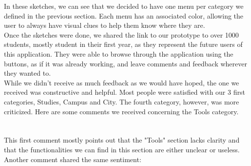\documentclass{eplmastersthesis}
\begin{document}
In these sketches, we can see that we decided to have one menu per category we defined in the previous section. Each menu has an associated color, allowing the user to always have visual clues to help them know where they are.\\

Once the sketches were done, we shared the link to our prototype to over 1000 students, mostly student in their first year, as they represent the future users of this application. They were able to browse through the application using the buttons, as if it was already working, and leave comments and feedback wherever they wanted to.\\

While we didn't receive as much feedback as we would have hoped, the one we received was constructive and helpful. Most people were satisfied with our 3 first categories, Studies, Campus and City. The fourth category, however, was more criticized. Here are some comments we received concerning the Tools category.\\


\\\\

This first comment mostly points out that the "Tools" section lacks clarity and that the functionalities we can find in this section are either unclear or useless. Another comment shared the same sentiment:\\

 \\
\end{document}
